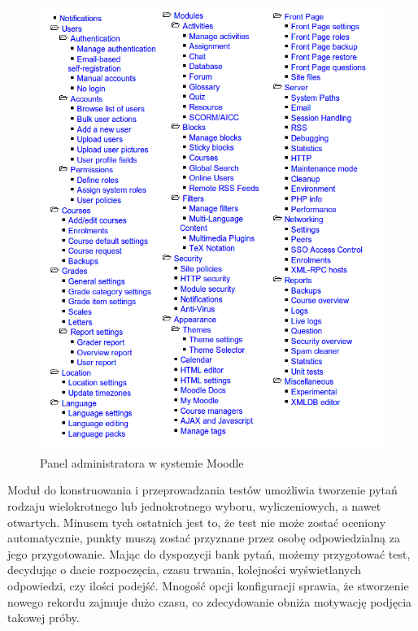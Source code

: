 \documentclass[a4paper,12pt]{article}
\begin{document}
\begin{figure}[ht]
  \begin{center}
    \includegraphics[width=1\linewidth]{images/moodle_panel.png}
  \end{center}
  \caption{Panel administratora w systemie Moodle}
  \label{fig:moodle_panel}
\end{figure}


Moduł do konstruowania i przeprowadzania testów umożliwia tworzenie pytań rodzaju
wielokrotnego lub jednokrotnego wyboru, wyliczeniowych, a nawet otwartych. Minusem tych
ostatnich jest to, że test nie może zostać oceniony automatycznie, punkty muszą zostać
przyznane przez osobę odpowiedzialną za jego przygotowanie. Mając do dyspozycji bank
pytań, możemy przygotować test, decydując o dacie rozpoczęcia, czasu trwania, kolejności
wyświetlanych odpowiedzi, czy ilości podejść. Mnogość opcji konfiguracji sprawia, że
stworzenie nowego rekordu zajmuje dużo czasu, co zdecydowanie obniża motywację podjęcia
takowej próby.
\end{document}
